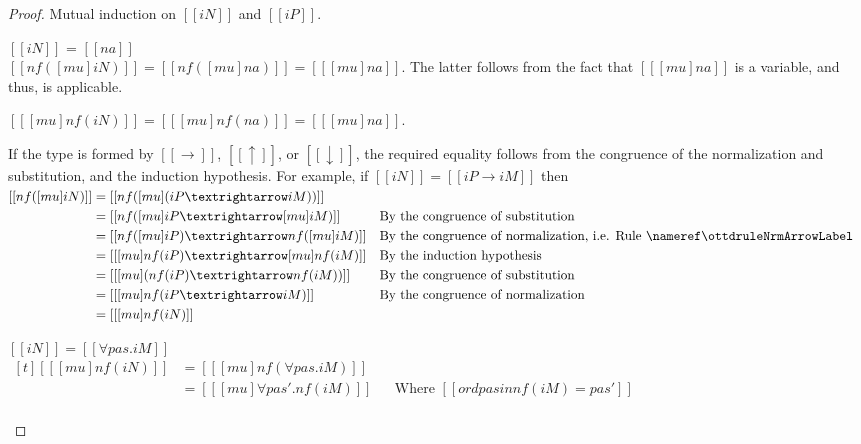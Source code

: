 \begin{proof}
  Mutual induction on $[[iN]]$ and $[[iP]]$.
  \begin{caseof}
    \item $[[iN]]$ = $[[na]]$ \\
      $[[nf([mu]iN)]] = [[ nf([mu]na) ]] = [[ [mu]na ]] $.
      The latter follows from the fact that $[[ [mu]na ]]$ is a variable, and thus, 
       is applicable.

      $[[ [mu] nf(iN) ]] = [[ [mu] nf(na) ]] = [[ [mu] na ]] $.
   \item If the type is formed by $[[→]]$, $[[↑]]$, or $[[↓]]$, 
     the required equality follows from the congruence of the normalization and
     substitution, and the induction hypothesis.
     For example, if $[[iN]] = [[iP → iM]]$ then \\
     $\begin{aligned}[t]
        [[nf([mu] iN)]] &= [[ nf([mu] (iP → iM)) ]] \\
                        &= [[ nf([mu]iP → [mu]iM) ]]
                        && \text{By the congruence of substitution} \\
                        &= [[ nf([mu]iP) → nf([mu]iM) ]]
                        && \text{By the congruence of normalization, i.e. \ruleref{\ottdruleNrmArrowLabel}} \\
                        &= [[ [mu]nf(iP) → [mu]nf(iM) ]]
                        && \text{By the induction hypothesis} \\
                        &= [[ [mu](nf(iP) → nf(iM)) ]]
                        && \text{By the congruence of substitution} \\
                        &= [[ [mu]nf(iP → iM) ]]
                        && \text{By the congruence of normalization} \\
                        &= [[ [mu]nf(iN) ]]
      \end{aligned}$ \\
    \item $[[iN]] = [[∀ pas.iM]]$ \label{case:norm-subst-commute} \\
      $\begin{aligned}[t]
          [[ [mu] nf(iN) ]] &= [[ [mu] nf(∀pas.iM)]] \\
                            &= [[ [mu] ∀pas'.nf(iM) ]]
                            && \text {Where $[[ ord {pas} in nf(iM) = pas' ]]$}\\
        \end{aligned}$ \\


\end{caseof}
\end{proof}
